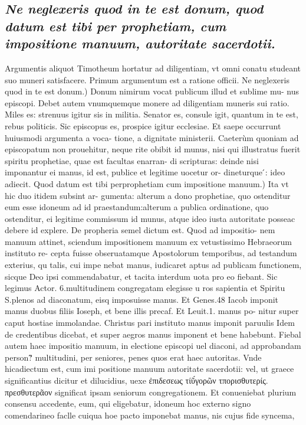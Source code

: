 \documentclass{article}
\begin{document}
\begin{pages}
\subsection*{\textit{Ne neglexeris quod in te est donum, quod datum est tibi per prophetiam, cum impositione manuum, autoritate sacerdotii. }}\pstart Argumentis aliquot Timotheum hortatur ad diligentiam, vt omni conatu studeant suo muneri satisfacere. Primum argumentum est a ratione officii.  \pend\pstart Ne neglexeris quod in te est donum.) Donum nimirum vocat publicum illud et sublime mu- nus episcopi. Debet autem vnumquemque monere ad diligentiam muneris sui ratio. Miles es: strenuus igitur sis in militia. Senator es, consule igit, quantum in te est, rebus politicis. Sic episcopus es, prospice igitur ecclesiae. Et saepe occurrunt huiusmodi argumenta a voca- tione, a dignitate ministerii. Caeterùm quoniam ad episcopatum non prouehitur, neque rite obibit id munus, nisi qui illustratus fuerit spiritu prophetiae, quae est facultas enarran- di scripturas: deinde nisi imponantur ei manus, id est, publice et legitime uocetur or- dineturque ́: ideo adiecit.  \pend\pstart Quod datum est tibi perprophetiam cum impositione manuum.) Ita vt hic duo itidem subsint ar- gumenta: alterum a dono prophetiae, quo ostenditur eum esse idoneum ad id praestandum:alterum a publica ordinatione, quo ostenditur, ei legitime commissum id munus, atque ideo iusta autoritate posseac debere id explere. De propheria semel dictum est. Quod ad impositio- nem manuum attinet, sciendum impositionem manuum ex vetustissimo Hebraeorum instituto re- cepta fuisse obseruatamque Apostolorum temporibus, ad testandum exterius, qu talis, cui impe nebat manus, iudicaret aptus ad publicam functionem, sicque Deo ipsi commendabatur, et tacita interdum uota pro eo fiebant. Sic legimus Actor. 6.multitudinem congregatam elegisse u ros sapientia et Spiritu S.plenos ad diaconatum, eisq imposuisse manus. Et Genes.48 Iacob imponit manus duobus filiis Ioseph, et bene illis precaf. Et Leuit.1. manus po- nitur super caput hostiae immolandae. Christus pari instituto manus imponit paruulis Idem de credentibus dicebat, et super aegros manus imponent et bene habebunt. Fiebal autem haec impositio manuum, in electione episcopi uel diaconi, ad approbandam person?̃ multitudini, per seniores, penes quos erat haec autoritas. Vnde hicadiectum est, cum imi positione manuum autoritate sacerdotii: vel, ut graece significantius dicitur et dilucidius, uexe ἐπιδεσεως τίῦ́γορῶν τπορισθυτερίς. πρεσθυτερᾶον significat ipsam seniorum congregationem. Et conueniebat plurium consensu accedente, eum, qui eligebatur, idoneum hoc externo signo comendarineo faclle cuiqua hoe pacto imponebat manus, nis cujus fide syncema,  \pend

\end{pages}
\end{document}
